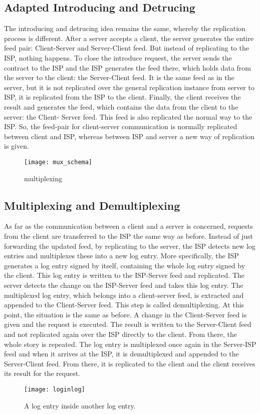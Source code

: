 \subsection{Adapted Introducing and Detrucing}
The introducing and detrucing idea remains the same, whereby the replication process is
different. After a server accepts a client, the server generates the entire feed pair: Client-Server and Server-Client feed. But instead of replicating to the ISP, nothing happens. To close the introduce request, the server sends the contract to the ISP and the ISP generates the feed there, which holds data from the server to the client: the Server-Client feed. It is the same feed as in the server, but it is not replicated over the general replication instance from server to ISP, it is replicated from the ISP to the client. Finally, the client receives the result and generates the feed, which contains the data from the client to the server: the Client- Server feed. This feed is also replicated the normal way to the ISP. So, the feed-pair for client-server communication is normally replicated between client and ISP, whereas between ISP and server a new way of replication is given.

\begin{figure}
    \centering
    \texttt{[image: mux\_schema]}
    \caption{multiplexing}
    \label{fig:mux}
\end{figure}

\subsection{Multiplexing and Demultiplexing}
As far as the communication between a client and a server is concerned, requests from the client are transferred to the ISP the same way as before. Instead of just forwarding the updated feed, by replicating to the server, the ISP detects new log entries and multiplexes these into a new log entry.
More specifically, the ISP generates a log entry signed by itself, containing the whole log entry signed by the client. This log entry is written to the ISP-Server feed and replicated. The server detects the change on the ISP-Server feed and takes this log entry. The multiplexed log entry, which belongs into a client-server feed, is extracted and appended to the Client-Server feed. This step is called demultiplexing. At this point, the situation is the same as before. A change in the Client-Server feed is given and the request is executed. The result is written to the Server-Client feed and not replicated again over the ISP directly to the client. From there, the whole story is repeated. The log entry is multiplexed once again in the Server-ISP feed and when it arrives at the ISP, it is demultiplexed and appended to the Server-Client feed. From there, it is replicated to the client and the client receives its result for the request.
\begin{figure}
    \centering
    \texttt{[image: loginlog]}
    \caption{A log entry inside another log entry.}
    \label{fig:loginlog}
\end{figure}


